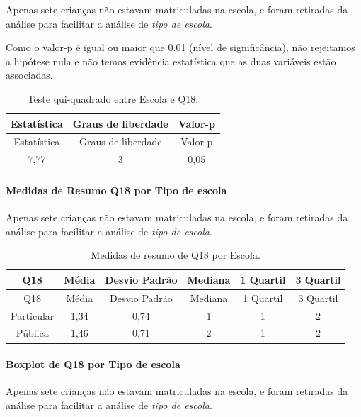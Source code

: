 \documentclass[]{article}
\let\oldparagraph\paragraph
\renewcommand{\paragraph}[1]{\oldparagraph{#1}\mbox{}}
\begin{document}
Apenas sete crianças não estavam matriculadas na escola, e foram retiradas da análise para facilitar a análise de \emph{tipo de escola}.

Como o valor-p é igual ou maior que 0.01 (nível de significância), não rejeitamos a hipótese nula e não temos evidência estatística que as duas variáveis estão associadas.

\begin{longtable}[]{@{}ccc@{}}
\caption{\label{tab:unnamed-chunk-291}Teste qui-quadrado entre Escola e Q18.}\tabularnewline
\toprule
Estatística & Graus de liberdade & Valor-p\tabularnewline
\midrule
\endfirsthead
\toprule
Estatística & Graus de liberdade & Valor-p\tabularnewline
\midrule
\endhead
7,77 & 3 & 0,05\tabularnewline
\bottomrule
\end{longtable}

\cleardoublepage

\hypertarget{medidas-de-resumo-q18-por-tipo-de-escola}{%
\paragraph{Medidas de Resumo Q18 por Tipo de escola}\label{medidas-de-resumo-q18-por-tipo-de-escola}}

Apenas sete crianças não estavam matriculadas na escola, e foram retiradas da análise para facilitar a análise de \emph{tipo de escola}.

\begin{longtable}[]{@{}cccccc@{}}
\caption{\label{tab:unnamed-chunk-292}Medidas de resumo de Q18 por Escola.}\tabularnewline
\toprule
Q18 & Média & Desvio Padrão & Mediana & 1 Quartil & 3 Quartil\tabularnewline
\midrule
\endfirsthead
\toprule
Q18 & Média & Desvio Padrão & Mediana & 1 Quartil & 3 Quartil\tabularnewline
\midrule
\endhead
Particular & 1,34 & 0,74 & 1 & 1 & 2\tabularnewline
Pública & 1,46 & 0,71 & 2 & 1 & 2\tabularnewline
\bottomrule
\end{longtable}

\hypertarget{boxplot-de-q18-por-tipo-de-escola}{%
\paragraph{Boxplot de Q18 por Tipo de escola}\label{boxplot-de-q18-por-tipo-de-escola}}

Apenas sete crianças não estavam matriculadas na escola, e foram retiradas da análise para facilitar a análise de \emph{tipo de escola}.
\end{document}
